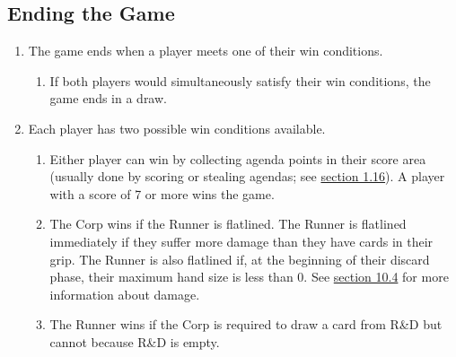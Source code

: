 \subsection{Ending the Game}
\begin{enumerate}
	\item The game ends when a player meets one of their win conditions.
	      \begin{enumerate}
		      \item If both players would simultaneously satisfy their win conditions, the game ends in a	draw.
	      \end{enumerate}
	\item Each player has two possible win conditions available.
	      \begin{enumerate}
		      \item Either player can win by collecting agenda points in their score area (usually done by scoring or stealing agendas; see \hyperlink{page.i}{section 1.16}). A player with a score of 7 or more wins the game.
		      \item The Corp wins if the Runner is flatlined. The Runner is flatlined immediately if they suffer more damage than they have cards in their grip. The Runner is also flatlined if, at the beginning of their discard phase, their maximum hand size is less than 0. See \hyperlink{page.i}{section 10.4} for more information about damage.
		      \item The Runner wins if the Corp is required to draw a card from R\&D but cannot because R\&D is empty.
	      \end{enumerate}
\end{enumerate}
